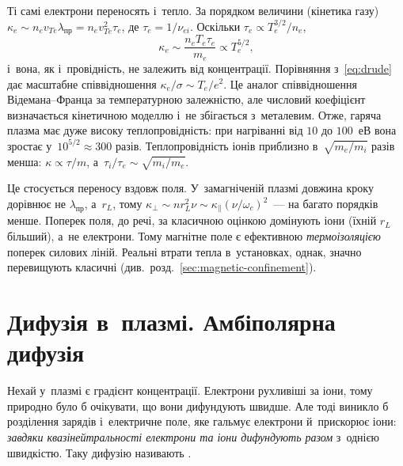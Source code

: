 Ті самі електрони переносять і~тепло. За порядком величини (кінетика газу) $\kappa_e\sim
n_ev_{Te}\lambda_{\mathrm{пр}}=n_ev_{Te}^2\tau_e$, де
$\tau_e=1/\nu_{ei}$. Оскільки $\tau_e\propto T_e^{3/2}/n_e$,
\begin{equation*}
	\kappa_e\sim\frac{n_eT_e\tau_e}{m_e}\propto T_e^{5/2},
\end{equation*}
і~вона, як і~провідність, не залежить від концентрації. Порівняння з~\eqref{eq:drude} дає
масштабне співвідношення $\kappa_e/\sigma\sim T_e/e^2$. Це аналог
співвідношення Відемана--Франца за температурною залежністю, але числовий коефіцієнт
визначається кінетичною моделлю і~не збігається з~металевим. Отже, гаряча плазма має дуже
високу теплопровідність: при нагріванні від $10$ до $100$~еВ вона зростає
у~$10^{5/2}\approx300$ разів. Теплопровідність іонів приблизно в~$\sqrt{m_e/m_i}$ разів
менша: $\kappa\propto\tau/m$, а~$\tau_i/\tau_e\sim\sqrt{m_i/m_e}$.

Це стосується переносу вздовж поля. У~замагніченій плазмі довжина кроку дорівнює не
$\lambda_{\mathrm{пр}}$, а~$r_L$, тому $\kappa_\perp\sim nr_L^2\nu\sim\kappa_\parallel(\nu/\omega_c)^2$~--- на багато порядків менше. Поперек
поля, до речі, за класичною оцінкою домінують іони (їхній $r_L$ більший), а~не електрони.
Тому магнітне поле є ефективною \emph{термоізоляцією} поперек силових ліній. Реальні
втрати тепла в~установках, однак, значно перевищують класичні
(див.~розд.~\ref{sec:magnetic-confinement}).

\section{Дифузія в~плазмі. Амбіполярна дифузія}\label{sec:ambipolar}

Нехай у~плазмі є градієнт концентрації. Електрони рухливіші за іони, тому природно було б
очікувати, що вони дифундують швидше. Але тоді виникло б розділення зарядів і~електричне
поле, яке гальмує електрони й~прискорює іони: \emph{завдяки квазінейтральності електрони
та іони дифундують разом} з~однією швидкістю. Таку дифузію називають .

